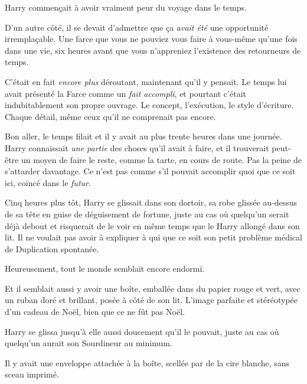 Harry commençait à avoir vraiment peur du voyage dans le temps.

D'un autre côté, il se devait d'admettre que ça \emph{avait été} une opportunité irremplaçable. Une farce que vous ne pouviez vous faire à vous-même qu'une fois dans une vie, six heures avant que vous n'appreniez l'existence des retourneurs de temps.

C'était en fait \emph{encore plus} déroutant, maintenant qu'il y pensait. Le temps lui avait présenté la Farce comme un \emph{fait accompli}, et pourtant c'était indubitablement son propre ouvrage. Le concept, l'exécution, le style d'écriture. Chaque détail, même ceux qu'il ne comprenait pas encore.

Bon aller, le temps filait et il y avait au plus trente heures dans une journée. Harry connaissait \emph{une partie} des choses qu'il avait à faire, et il trouverait peut-être un moyen de faire le reste, comme la tarte, en cours de route. Pas la peine de s'attarder davantage. Ce n'est pas comme s'il pouvait accomplir quoi que ce soit ici, coincé dans le \emph{futur}.

\later


Cinq heures plus tôt, Harry se glissait dans son dortoir, sa robe glissée au-dessus de sa tête en guise de déguisement de fortune, juste au cas où quelqu'un serait déjà debout et risquerait de le voir en même temps que le Harry allongé dans son lit. Il ne voulait pas avoir à expliquer à qui que ce soit son petit problème médical de Duplication spontanée.

Heureusement, tout le monde semblait encore endormi.

Et il semblait aussi y avoir une boîte, emballée dans du papier rouge et vert, avec un ruban doré et brillant, posée à côté de son lit. L'image parfaite et stéréotypée d'un cadeau de Noël, bien que ce ne fût pas Noël.

Harry se glissa jusqu'à elle aussi doucement qu'il le pouvait, juste au cas où quelqu'un aurait son Sourdineur au minimum.

Il y avait une enveloppe attachée à la boîte, scellée par de la cire blanche, sans sceau imprimé.

